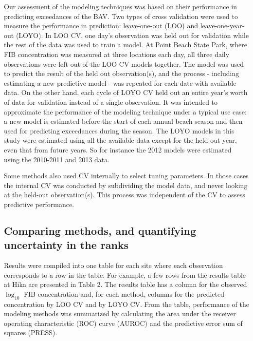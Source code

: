 Our assessment of the modeling techniques was based on their performance
in predicting exceedances of the BAV. Two types of cross validation were
used to measure the performance in prediction: leave-one-out (LOO) and
leave-one-year-out (LOYO). In LOO CV, one day's observation was held out
for validation while the rest of the data was used to train a model. At
Point Beach State Park, where FIB concentration was measured at three
locations each day, all three daily observations were left out of the
LOO CV models together. The model was used to predict the result of the
held out observation(s), and the process - including estimating a new
predictive model - was repeated for each date with available data. On
the other hand, each cycle of LOYO CV held out an entire year's worth of
data for validation instead of a single observation. It was intended to
approximate the performance of the modeling technique under a typical
use case: a new model is estimated before the start of each annual beach
season and then used for predicting exceedances during the season. The
LOYO models in this study were estimated using all the available data
except for the held out year, even that from future years. So for
instance the 2012 models were estimated using the 2010-2011 and 2013
data.

Some methods also used CV internally to select tuning parameters. In
those cases the internal CV was conducted by subdividing the model data,
and never looking at the held-out observation(s). This process was
independent of the CV to assess predictive performance.

\subsection{Comparing methods, and quantifying uncertainty in the
ranks}\label{comparing-methods-and-quantifying-uncertainty-in-the-ranks}

Results were compiled into one table for each site where each
observation corresponds to a row in the table. For example, a few rows
from the results table at Hika are presented in Table 2. The results
table has a column for the observed \(\log_{10}\) FIB concentration and,
for each method, columns for the predicted concentration by LOO CV and
by LOYO CV. From the table, performance of the modeling methods was
summarized by calculating the area under the receiver operating
characteristic (ROC) curve (AUROC) and the predictive error sum of
squares (PRESS).

